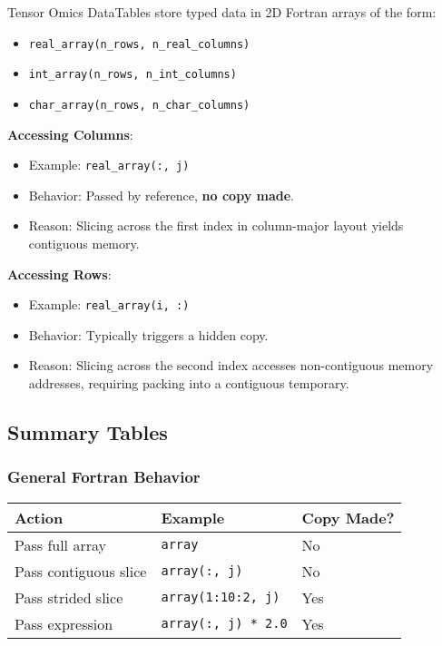 \documentclass{article}
\begin{document}
Tensor Omics DataTables store typed data in 2D Fortran arrays of the form:

\begin{itemize}
    \item \texttt{real\_array(n\_rows, n\_real\_columns)}
    \item \texttt{int\_array(n\_rows, n\_int\_columns)}
    \item \texttt{char\_array(n\_rows, n\_char\_columns)}
\end{itemize}

\textbf{Accessing Columns}:

\begin{itemize}
    \item Example: \texttt{real\_array(:, j)}
    \item Behavior: Passed by reference, \textbf{no copy made}.
    \item Reason: Slicing across the first index in column-major layout yields contiguous memory.
\end{itemize}

\textbf{Accessing Rows}:

\begin{itemize}
    \item Example: \texttt{real\_array(i, :)}
    \item Behavior: Typically triggers a hidden copy.
    \item Reason: Slicing across the second index accesses non-contiguous memory addresses, requiring packing into a contiguous temporary.
\end{itemize}

\subsection{Summary Tables}

\subsubsection{General Fortran Behavior}

\begin{center}
\begin{tabular}{|l|l|l|}
\hline
\textbf{Action} & \textbf{Example} & \textbf{Copy Made?} \\
\hline
Pass full array & \texttt{array} & No \\
Pass contiguous slice & \texttt{array(:, j)} & No \\
Pass strided slice & \texttt{array(1:10:2, j)} & Yes \\
Pass expression & \texttt{array(:, j) * 2.0} & Yes \\
\hline
\end{tabular}
\end{center}
\end{document}
